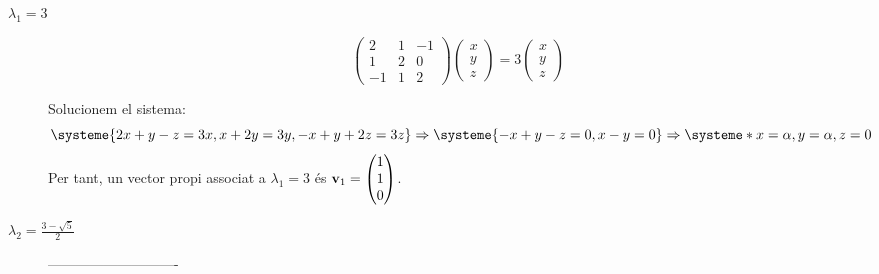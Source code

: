 \begin{description}
  \item[$\boxed{\lambda_1=3}$] 
  \[
  \begin{pmatrix}2&1&-1\\1&2&0\\-1&1&2\end{pmatrix}
  \begin{pmatrix}x\\y\\z\end{pmatrix}=3\begin{pmatrix}x\\y\\z\end{pmatrix}\]

  Solucionem el sistema:
  \[
    \systeme{2x+y-z=3x,x+2y=3y,-x+y+2z=3z} \Rightarrow
    \systeme{-x+y-z=0,x-y=0}  \Rightarrow
    \systeme*{x=\alpha,y=\alpha,z=0}\]
  Per tant, un vector propi associat a $\lambda_1=3$ és $\textbf{v}_1=\begin{pmatrix}1\\1\\0\end{pmatrix}$. 

  \item[$\boxed{\lambda_2=\frac{3-\sqrt{5}}{2}}$] 
  ----------------------------
  

\end{description}
